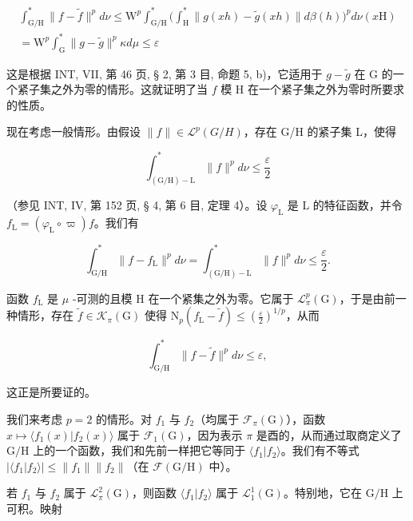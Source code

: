 \[
\begin{array}{c} \int_ {\mathrm{G/H}} ^ {*} \| f - \widetilde {f} \| ^ {p} d \nu \leqslant \mathrm{W} ^ {p} \int_ {\mathrm{G/H}} ^ {*} \Big (\int_ {\mathrm{H}} ^ {*} \| g (x h) - \widetilde {g} (x h) \| d \beta (h) \Big) ^ {p} d \nu (x \mathrm{H}) \\ = \mathrm{W} ^ {p} \int_ {\mathrm{G}} ^ {*} \| g - \widetilde {g} \| ^ {p} \kappa d \mu \leqslant \varepsilon \end{array}
\]

这是根据 INT, VII, 第 46 页, § 2, 第 3 目, 命题 5, b)，它适用于 \(g - \widetilde{g}\) 在 G 的一个紧子集之外为零的情形。这就证明了当 \(f\) 模 H 在一个紧子集之外为零时所要求的性质。

现在考虑一般情形。由假设 \(\|f\|\in\mathcal{L}^{p}(G/H)\)，存在 G/H 的紧子集 L，使得

\[
\int_ {(\mathrm{G} / \mathrm{H}) - \mathrm{L}} ^ {*} \| f \| ^ {p} d \nu \leqslant \frac {\varepsilon}{2}
\]

（参见 INT, IV, 第 152 页, § 4, 第 6 目, 定理 4）。设 \(\varphi_{\mathrm{L}}\) 是 L 的特征函数，并令 \(f_{\mathrm{L}} = (\varphi_{\mathrm{L}} \circ \varpi)f\)。我们有

\[
\int_ {\mathrm{G} / \mathrm{H}} ^ {*} \| f - f _ {\mathrm{L}} \| ^ {p} d \nu = \int_ {(\mathrm{G} / \mathrm{H}) - \mathrm{L}} ^ {*} \| f \| ^ {p} d \nu \leqslant \frac {\varepsilon}{2}.
\]

函数 \(f_{\mathrm{L}}\) 是 \(\mu\) -可测的且模 H 在一个紧集之外为零。它属于 \(\mathcal{L}_{\pi}^{p}(\mathrm{G})\)，于是由前一种情形，存在 \(\widetilde{f} \in \mathcal{K}_{\pi}(\mathrm{G})\) 使得 \(\mathrm{N}_p(f_{\mathrm{L}} - \widetilde{f}) \leqslant (\frac{\varepsilon}{2})^{1/p}\)，从而

\[
\int_ {\mathrm{G/H}} ^ {*} \| f - \widetilde {f} \| ^ {p} d \nu \leqslant \varepsilon ,
\]

这正是所要证的。

 我们来考虑 \(p = 2\) 的情形。对 \(f_1\) 与 \(f_2\)（均属于 \(\mathcal{F}_{\pi}(\mathrm{G})\)），函数 \(x \mapsto \langle f_1(x) | f_2(x) \rangle\) 属于 \(\mathcal{F}_1(\mathrm{G})\)，因为表示 \(\pi\) 是酉的，从而通过取商定义了 \(\mathrm{G / H}\) 上的一个函数，我们和先前一样把它等同于 \(\langle f_1 | f_2 \rangle\)。我们有不等式 \(|\langle f_1 | f_2 \rangle| \leqslant \| f_1 \| \| f_2 \|\)（在 \(\mathcal{F}(\mathrm{G / H})\) 中）。

若 \(f_1\) 与 \(f_2\) 属于 \(\mathcal{L}_\pi^2(\mathrm{G})\)，则函数 \(\langle f_1 | f_2 \rangle\) 属于 \(\mathcal{L}_1^1(\mathrm{G})\)。特别地，它在 \(\mathrm{G/H}\) 上可积。映射

